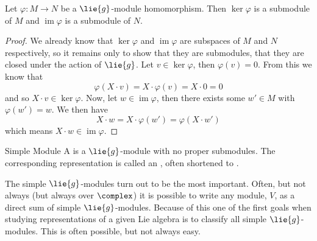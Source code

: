 \documentclass[fleqn]{NotesClass}
\DeclareMathOperator{\im}{im}
\begin{document}
    \begin{lma}{}{}
        Let \(\varphi \colon M \to N\) be a \(\lie{g}\)-module homomorphism.
        Then \(\ker \varphi\) is a submodule of \(M\) and \(\im \varphi\) is a submodule of \(N\).
        \begin{proof}
            We already know that \(\ker \varphi\) and \(\im \varphi\) are subspaces of \(M\) and \(N\) respectively, so it remains only to show that they are submodules, that they are closed under the action of \(\lie{g}\).
            Let \(v \in \ker \varphi\), then \(\varphi(v) = 0\).
            From this we know that
            \begin{equation}
                \varphi(X \cdot v) = X \cdot \varphi(v) = X \cdot 0 = 0
            \end{equation}
            and so \(X \cdot v \in \ker \varphi\).
            Now, let \(w \in \im \varphi\), then there exists some \(w' \in M\) with \(\varphi(w') = w\).
            We then have
            \begin{equation}
                X \cdot w = X \cdot \varphi(w') = \varphi(X \cdot w')
            \end{equation}
            which means \(X \cdot w \in \im \varphi\).
        \end{proof}
    \end{lma}
    
    \begin{dfn}{Simple Module}{}
        A  is a \(\lie{g}\)-module with no proper submodules.
        The corresponding representation is called an , often shortened to .
    \end{dfn}
    
    The simple \(\lie{g}\)-modules turn out to be the most important.
    Often, but not always (but always over \(\complex\)) it is possible to write any module, \(V\), as a direct sum of simple \(\lie{g}\)-modules.
    Because of this one of the first goals when studying representations of a given Lie algebra is to classify all simple \(\lie{g}\)-modules.
    This is often possible, but not always easy.
    
\end{document}
